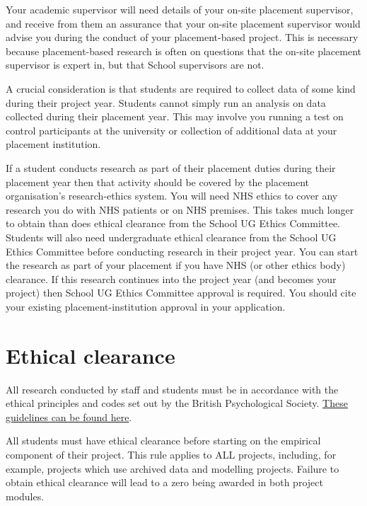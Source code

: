 \documentclass[
]{book}
\begin{document}
Your academic supervisor will need details of your on-site placement supervisor, and receive from them an assurance that your on-site placement supervisor would advise you during the conduct of your placement-based project. This is necessary because placement-based research is often on questions that the on-site placement supervisor is expert in, but that School supervisors are not.

A crucial consideration is that students are required to collect data of some kind during their project year. Students cannot simply run an analysis on data collected during their placement year. This may involve you running a test on control participants at the university or collection of additional data at your placement institution.

If a student conducts research as part of their placement duties during their placement year then that activity should be covered by the placement organisation's research-ethics system. You will need NHS ethics to cover any research you do with NHS patients or on NHS premises. This takes much longer to obtain than does ethical clearance from the School UG Ethics Committee. Students will also need undergraduate ethical clearance from the School UG Ethics Committee before conducting research in their project year. You can start the research as part of your placement if you have NHS (or other ethics body) clearance. If this research continues into the project year (and becomes your project) then School UG Ethics Committee approval is required. You should cite your existing placement-institution approval in your application.

\chapter{Ethical clearance}\label{ethical-clearance}

All research conducted by staff and students must be in accordance with the ethical principles and codes set out by the British Psychological Society. \href{https://www.bps.org.uk/sites/bps.org.uk/files/Policy/Policy\%20-\%20Files/BPS\%20Code\%20of\%20Human\%20Research\%20Ethics.pdf}{These guidelines can be found here}.

All students must have ethical clearance before starting on the empirical component of their project. This rule applies to ALL projects, including, for example, projects which use archived data and modelling projects. Failure to obtain ethical clearance will lead to a zero being awarded in both project modules.
\end{document}
